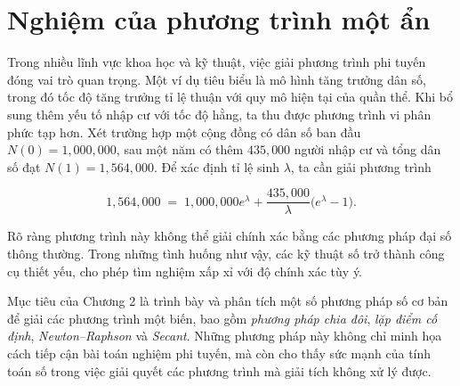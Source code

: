 \chapter{Nghiệm của phương trình một ẩn}
Trong nhiều lĩnh vực khoa học và kỹ thuật, việc giải phương trình phi tuyến đóng vai trò quan trọng. 
Một ví dụ tiêu biểu là mô hình tăng trưởng dân số, trong đó tốc độ tăng trưởng tỉ lệ thuận với quy mô hiện tại của quần thể. 
Khi bổ sung thêm yếu tố nhập cư với tốc độ hằng, ta thu được phương trình vi phân phức tạp hơn. 
Xét trường hợp một cộng đồng có dân số ban đầu $N(0) = 1{,}000{,}000$, sau một năm có thêm $435{,}000$ người nhập cư và tổng dân số đạt $N(1) = 1{,}564{,}000$. 
Để xác định tỉ lệ sinh $\lambda$, ta cần giải phương trình

\[
1{,}564{,}000 \;=\; 1{,}000{,}000 e^{\lambda} + \frac{435{,}000}{\lambda}\big(e^{\lambda} - 1\big).
\]

Rõ ràng phương trình này không thể giải chính xác bằng các phương pháp đại số thông thường. 
Trong những tình huống như vậy, các kỹ thuật số trở thành công cụ thiết yếu, cho phép tìm nghiệm xấp xỉ với độ chính xác tùy ý. 

Mục tiêu của Chương 2 là trình bày và phân tích một số phương pháp số cơ bản để giải các phương trình một biến, 
bao gồm \textit{phương pháp chia đôi}, \textit{lặp điểm cố định}, \textit{Newton--Raphson} và \textit{Secant}. 
Những phương pháp này không chỉ minh họa cách tiếp cận bài toán nghiệm phi tuyến, 
mà còn cho thấy sức mạnh của tính toán số trong việc giải quyết các phương trình mà giải tích không xử lý được.






